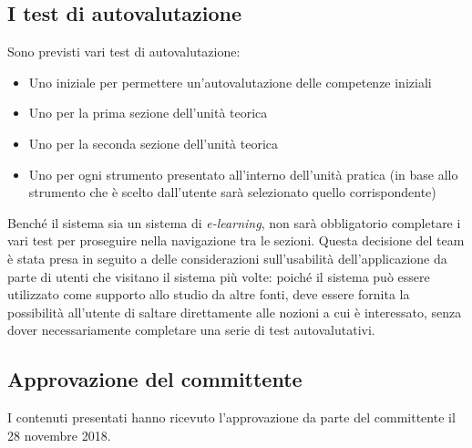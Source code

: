 \subsection{I test di autovalutazione}
Sono previsti vari test di autovalutazione:
\begin{itemize}
	\item Uno iniziale per permettere un'autovalutazione delle competenze iniziali
	\item Uno per la prima sezione dell'unità teorica
	\item Uno per la seconda sezione dell'unità teorica
	\item Uno per ogni strumento presentato all'interno dell'unità pratica (in base allo strumento che è scelto dall'utente sarà selezionato quello corrispondente)
\end{itemize}
Benché il sistema sia un sistema di \emph{e-learning}, non sarà obbligatorio completare i vari test per proseguire nella navigazione tra le sezioni. Questa decisione del team è stata presa in seguito a delle considerazioni sull'usabilità dell'applicazione da parte di utenti che visitano il sistema più volte: poiché il sistema può essere utilizzato come supporto allo studio da altre fonti, deve essere fornita la possibilità all'utente di saltare direttamente alle nozioni a cui è interessato, senza dover necessariamente completare una serie di test autovalutativi.

\subsection*{Approvazione del committente}
I contenuti presentati hanno ricevuto l'approvazione da parte del committente il 28 novembre 2018.